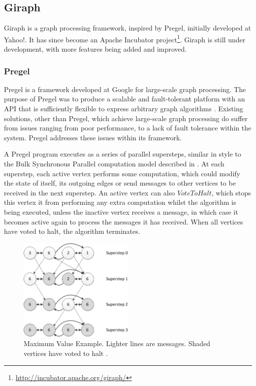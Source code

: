 \subsection{Giraph}
Giraph is a graph processing framework, inspired by Pregel, initially developed at Yahoo!. It has since become an Apache Incubator project\footnote{\url{http://incubator.apache.org/giraph/}}. Giraph is still under development, with more features being added and improved.

\subsubsection{Pregel}
Pregel is a framework developed at Google for large-scale graph processing. The purpose of Pregel was to produce a scalable and fault-tolerant platform with an API that is sufficiently flexible to express arbitrary graph algorithms \cite{pregel}. Existing solutions, other than Pregel, which achieve large-scale graph processing do suffer from issues ranging from poor performance, to a lack of fault tolerance within the system. Pregel addresses these issues within its framework.

A Pregel program executes as a series of parallel supersteps, similar in style to the Bulk Synchronous Parallel computation model described in \cite{bsp}. At each superstep, each active vertex performs some computation, which could modify the state of itself, its outgoing edges or send messages to other vertices to be received in the next superstep. An active vertex can also $VoteToHalt$, which stops this vertex it from performing any extra computation whilst the algorithm is being executed, unless the inactive vertex receives a message, in which case it becomes active again to process the messages it has received. When all vertices have voted to halt, the algorithm terminates.

\begin{figure}[htbp]
  \centering
    \includegraphics[width=0.5\textwidth]{./img/superstep}
  \caption{Maximum Value Example. Lighter lines are messages. Shaded vertices have voted to halt \cite{pregel}.}
  \label{fig:superstep}
\end{figure}

